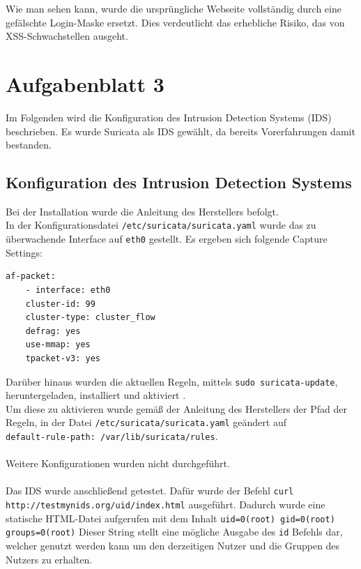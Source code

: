 \documentclass[
    a4paper,
    pagesize,
	pdftex,
    12pt,
]{scrartcl}
\begin{document}
\noindent Wie man sehen kann, wurde die ursprüngliche Webseite vollständig durch eine gefälschte Login-Maske ersetzt. Dies verdeutlicht das erhebliche Risiko, das von XSS-Schwachstellen ausgeht.

\FloatBarrier

\newpage
\section{Aufgabenblatt 3}
Im Folgenden wird die Konfiguration des Intrusion Detection Systems (IDS) beschrieben. Es wurde Suricata als IDS gewählt, da bereits Vorerfahrungen damit bestanden.

\subsection{Konfiguration des Intrusion Detection Systems}\label{config-ids}
Bei der Installation wurde die Anleitung des Herstellers \cite{suricata-quickstart} befolgt. \\
In der Konfigurationsdatei \lstinline[breaklines]|/etc/suricata/suricata.yaml| wurde das zu überwachende Interface auf \lstinline[breaklines]|eth0| gestellt. Es ergeben sich folgende Capture Settings:
\begin{lstlisting}[breaklines]
	af-packet:
	- interface: eth0
	cluster-id: 99
	cluster-type: cluster_flow
	defrag: yes
	use-mmap: yes
	tpacket-v3: yes
\end{lstlisting}
Darüber hinaus wurden die aktuellen Regeln, mittels \lstinline[breaklines]|sudo suricata-update|, heruntergeladen, installiert und aktiviert \cite{suricata-rulemanagement}. \\
Um diese zu aktivieren wurde gemäß der Anleitung des Herstellers der Pfad der Regeln, in der Datei \lstinline[breaklines]|/etc/suricata/suricata.yaml| geändert auf \\ \lstinline[breaklines]|default-rule-path: /var/lib/suricata/rules|. \\ \\
Weitere Konfigurationen wurden nicht durchgeführt. \\ \\
Das IDS wurde anschließend getestet. Dafür wurde der Befehl
\lstinline[breaklines]|curl http://testmynids.org/uid/index.html|
ausgeführt. Dadurch wurde eine statische HTML-Datei aufgerufen mit dem Inhalt 
\lstinline[breaklines]|uid=0(root) gid=0(root) groups=0(root)| 
Dieser String stellt eine mögliche Ausgabe des \lstinline[breaklines]|id| Befehls dar, welcher genutzt werden kann um den derzeitigen Nutzer und die Gruppen des Nutzers zu erhalten. \\ \\
\end{document}
